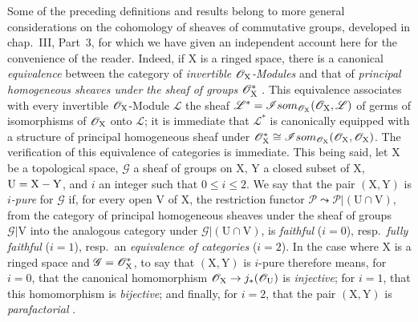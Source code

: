 \begin{remark}[21.13.13]
\label{IV.21.13.13}
Some of the preceding definitions and results belong to more general considerations on the cohomology of sheaves of commutative groups, developed in chap.~III, Part~3, for which we have given an independent account here for the convenience of the reader.
Indeed, if $\mathrm{X}$ is a ringed space, there is a canonical \emph{equivalence} between the category of \emph{invertible $\mathscr{O}_{\mathrm{X}}$-Modules} and that of \emph{principal homogeneous sheaves under the sheaf of groups} $\mathscr{O}_{\mathrm{X}}^*$ .
This equivalence associates with every invertible $\mathscr{O}_{\mathrm{X}}$-Module $\mathscr{L}$ the sheaf $\mathscr{L}^*=\mathscr{I}som_{\mathscr{O}_{\mathrm{X}}}(\mathscr{O}_{\mathrm{X}},\mathscr{L})$ of germs of isomorphisms of $\mathscr{O}_{\mathrm{X}}$ onto $\mathscr{L}$; it is immediate that $\mathscr{L}^*$ is canonically equipped with a structure of principal homogeneous sheaf under $\mathscr{O}_{\mathrm{X}}^*\cong\mathscr{I}som_{\mathscr{O}_{\mathrm{X}}}(\mathscr{O}_{\mathrm{X}},\mathscr{O}_{\mathrm{X}})$.
The verification of this equivalence of categories is immediate.
This being said, let $\mathrm{X}$ be a topological space, $\mathscr{G}$ a sheaf of groups on $\mathrm{X}$, $\mathrm{Y}$ a closed subset of $\mathrm{X}$, $\mathrm{U}=\mathrm{X}-\mathrm{Y}$, and $i$ an integer such that $0\leq i\leq 2$. We say that the pair $(\mathrm{X},\mathrm{Y})$ is \emph{$i$-pure} for $\mathscr{G}$ if, for every open $\mathrm{V}$ of $\mathrm{X}$, the restriction functor $\mathscr{P}\leadsto\mathscr{P}|(\mathrm{U}\cap\mathrm{V})$, from the category of principal homogeneous sheaves under the sheaf of groups $\mathscr{G}|\mathrm{V}$ into the analogous category under $\mathscr{G}|(\mathrm{U}\cap\mathrm{V})$, is \emph{faithful} ($i=0$), resp.\ \emph{fully faithful} ($i=1$), resp.\ an \emph{equivalence of categories} ($i=2$).
In the case where $\mathrm{X}$ is a ringed space and $\mathscr{G}=\mathscr{O}_{\mathrm{X}}^*$, to say that $(\mathrm{X},\mathrm{Y})$ is $i$-pure therefore means, for $i=0$, that the canonical homomorphism $\mathscr{O}_{\mathrm{X}}\to j_*(\mathscr{O}_{\mathrm{U}})$ is \emph{injective}; for $i=1$, that this homomorphism is \emph{bijective}; and finally, for $i=2$, that the pair $(\mathrm{X},\mathrm{Y})$ is \emph{parafactorial} .


\end{remark}
